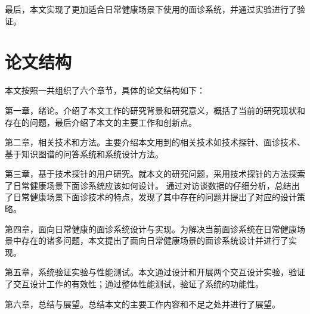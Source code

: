 最后，本文实现了更加适合日常健康场景下使用的面诊系统，并通过实验进行了验证。




\section{论文结构}
本文按照一共组织了六个章节，具体的论文结构如下：

第一章，绪论。介绍了本文工作的研究背景和研究意义，概括了当前的研究现状和存在的问题，最后介绍了本文的主要工作和创新点。

第二章，相关技术和方法。主要介绍本文用到的相关技术如技术探针、面诊技术、基于知识图谱的问答系统和系统设计方法。

第三章，基于技术探针的用户研究。就本文的研究问题，采用技术探针的方法探索了日常健康场景下面诊系统应该如何设计。
通过对访谈数据的仔细分析，总结出了日常健康场景下面诊技术的特点，发现了其中存在的问题并提出了对应的设计策略。

第四章，面向日常健康的面诊系统设计与实现。为解决当前面诊系统在日常健康场景中存在的诸多问题，本文提出了面向日常健康场景的面诊系统设计并进行了实现。

第五章，系统验证实验与性能测试。本文通过设计和开展两个交互设计实验，验证了交互设计工作的有效性；通过整体性能测试，验证了系统的功能性。

第六章，总结与展望。总结本文的主要工作内容和不足之处并进行了展望。